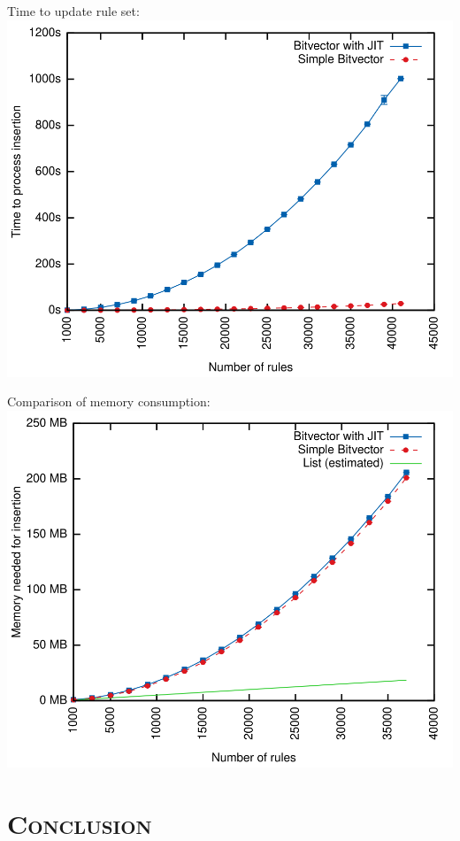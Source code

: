 \documentclass[xcolor=x11names,compress]{beamer}
\renewcommand{\(}{\begin{columns}}
\renewcommand{\)}{\end{columns}}
\newcommand{\<}[1]{\begin{column}{#1}}
\renewcommand{\>}{\end{column}}
\begin{document}
\begin{frame}
  Time to update rule set:
  \includegraphics[height=0.9\textheight]{figures/eval_time}
\end{frame}

\begin{frame}
  Comparison of memory consumption:
  \includegraphics[height=0.9\textheight]{figures/eval_mem}
\end{frame}

\section{\scshape Conclusion}
\end{document}
